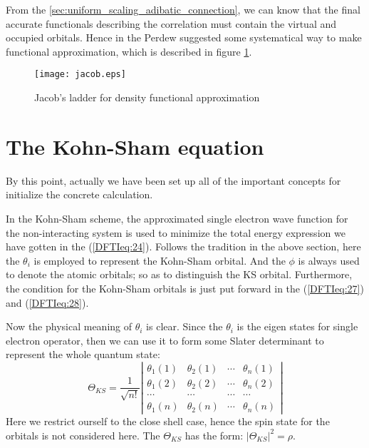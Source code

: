 From the \ref{sec:uniform_scaling_adibatic_connection}, we can know that the
final accurate functionals describing the correlation must contain the virtual
and occupied orbitals. Hence in the \cite{jacob_ladder} Perdew suggested some
systematical way to make functional approximation, which is described in
figure \ref{jacob}.

\begin{figure}[!hbp]
\label{jacob}
\begin{center}
\texttt{[image: jacob.eps]}
\caption{Jacob's ladder for density functional approximation}
\end{center}
\end{figure}


\section{The Kohn-Sham equation}
\label{DFTI:4}
%
%
%
By this point, actually we have been set up all of the important
concepts for initialize the concrete calculation.

In the Kohn-Sham scheme, the approximated single electron wave
function for the non-interacting system is used to minimize the
total energy expression we have gotten in the (\ref{DFTIeq:24}).
Follows the tradition in the above section, here the $\theta_{i}$ is
employed to represent the Kohn-Sham orbital. And the $\phi$ is
always used to denote the atomic orbitals; so as to distinguish the
KS orbital. Furthermore, the condition for the Kohn-Sham orbitals is
just put forward in the (\ref{DFTIeq:27}) and (\ref{DFTIeq:28}).

Now the physical meaning of $\theta_{i}$ is clear. Since the
$\theta_{i}$ is the eigen states for single electron operator, then
we can use it to form some Slater determinant to represent the whole
quantum state:
\begin{equation}
\label{DFTIeq:11}
  \Theta_{KS}=\frac{1}{\sqrt{n!}}   \left | \begin{array}{cccc}
      \theta_{1}(1) & \theta_{2}(1) & \cdots & \theta_{n}(1) \\
      \theta_{1}(2) & \theta_{2}(2) & \cdots & \theta_{n}(2) \\
      \cdots & \cdots & \cdots & \cdots                      \\
      \theta_{1}(n) & \theta_{2}(n) & \cdots & \theta_{n}(n)
    \end{array} \right |
\end{equation}
Here we restrict ourself to the close shell case, hence the spin
state for the orbitals is not considered here. The $\Theta_{KS}$ has
the form: $|\Theta_{KS}|^{2}=\rho$.

